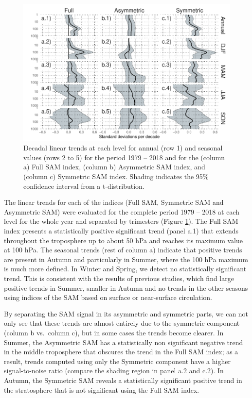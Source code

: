 \documentclass[smallextended]{svjour3}       %
\begin{document}
\begin{figure}
\includegraphics{trends-1} \caption{Decadal linear trends at each level for annual (row 1) and seasonal values (rows 2 to 5) for the period 1979 -- 2018 and for the (column a) Full SAM index, (column b) Asymmetric SAM index, and (column c) Symmetric SAM index. Shading indicates the 95\% confidence interval from a t-distribution.}\label{fig:trends}
\end{figure}

The linear trends for each of the indices (Full SAM, Symmetric SAM and Asymmetric SAM) were evaluated for the complete period 1979 -- 2018 at each level for the whole year and separated by trimesters (Figure \ref{fig:trends}). The Full SAM index presents a statistically positive significant trend (panel a.1) that extends throughout the troposphere up to about 50 hPa and reaches its maximum value at 100 hPa. The seasonal trends (rest of column a) indicate that positive trends are present in Autumn and particularly in Summer, where the 100 hPa maximum is much more defined. In Winter and Spring, we detect no statistically significant trend. This is consistent with the results of previous studies, which find large positive trends in Summer, smaller in Autumn and no trends in the other seasons \citep[e.g.][ and references therein]{fogt2020} using indices of the SAM based on surface or near-surface circulation.

By separating the SAM signal in its asymmetric and symmetric parts, we can not only see that these trends are almost entirely due to the symmetric component (column b vs.~column c), but in some cases the trends become clearer. In Summer, the Asymmetric SAM has a statistically non significant negative trend in the middle troposphere that obscures the trend in the Full SAM index; as a result, trends computed using only the Symmetric component have a higher signal-to-noise ratio (compare the shading region in panel a.2 and c.2). In Autumn, the Symmetric SAM reveals a statistically significant positive trend in the stratosphere that is not significant using the Full SAM index.
\end{document}
